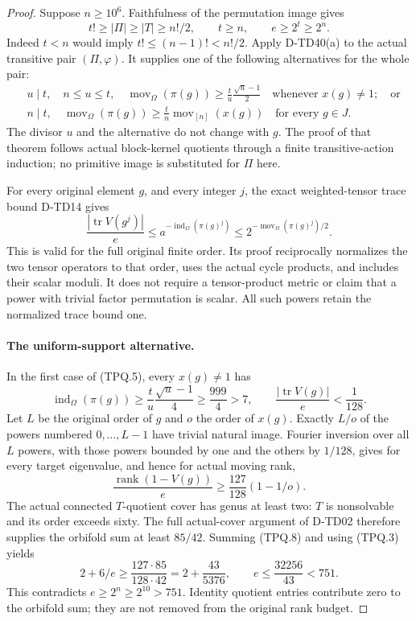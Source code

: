 \begin{proof}
Suppose $n\ge10^6$. Faithfulness of the permutation image gives
\[
               t!\ge|\Pi|\ge|T|\ge n!/2,
                    \qquad t\ge n,
                    \qquad e\ge2^t\ge2^n.
 \tag{TPQ.4}
\]
Indeed $t<n$ would imply $t!\le(n-1)!<n!/2$.
Apply D-TD40(a) to the actual transitive pair $(\Pi,\varphi)$.
It supplies one of the following alternatives for the whole pair:
\[
 \begin{split}
 &u\mid t,\quad n\le u\le t,\quad
 \operatorname{mov}_\Omega(\pi(g))
       \ge\frac{t}{u}\frac{\sqrt u-1}{2}
       \quad\text{whenever }x(g)\ne1;\quad\text{or}\\
 &n\mid t,\quad
 \operatorname{mov}_\Omega(\pi(g))
       \ge\frac{t}{n}\operatorname{mov}_{[n]}(x(g))
       \quad\text{for every }g\in J.
 \end{split}
 \tag{TPQ.5}
\]
The divisor $u$ and the alternative do not change with $g$.
The proof of that theorem follows actual block-kernel quotients
through a finite transitive-action induction; no primitive image
is substituted for $\Pi$ here.

For every original element $g$, and every integer $j$, the exact
weighted-tensor trace bound D-TD14 gives
\[
 \frac{|\operatorname{tr}V(g^j)|}{e}
    \le a^{-\operatorname{ind}_\Omega(\pi(g)^j)}
    \le2^{-\operatorname{mov}_\Omega(\pi(g)^j)/2}.
 \tag{TPQ.6}
\]
This is valid for the full original finite order. Its proof
reciprocally normalizes the two tensor operators to that order,
uses the actual cycle products, and includes their scalar moduli.
It does not require a tensor-product metric or claim that a power
with trivial factor permutation is scalar. All such powers retain
the normalized trace bound one.

\paragraph{The uniform-support alternative.}
In the first case of (TPQ.5), every $x(g)\ne1$ has
\[
 \operatorname{ind}_\Omega(\pi(g))
    \ge\frac{t}{u}\frac{\sqrt u-1}{4}
    \ge\frac{999}{4}>7,
 \qquad
 \frac{|\operatorname{tr}V(g)|}{e}<\frac1{128}.
 \tag{TPQ.7}
\]
Let $L$ be the original order of $g$ and $o$ the order of $x(g)$.
Exactly $L/o$ of the powers numbered $0,\ldots,L-1$ have trivial
natural image. Fourier inversion over all $L$ powers, with those
powers bounded by one and the others by $1/128$, gives for every
target eigenvalue, and hence for actual moving rank,
\[
          \frac{\operatorname{rank}(1-V(g))}{e}
                  \ge\frac{127}{128}(1-1/o).
 \tag{TPQ.8}
\]
The actual connected $T$-quotient cover has genus at least two:
$T$ is nonsolvable and its order exceeds sixty. The full actual-cover
argument of D-TD02 therefore supplies the orbifold sum at least
$85/42$. Summing (TPQ.8) and using (TPQ.3) yields
\[
 2+6/e\ge\frac{127\cdot85}{128\cdot42}
          =2+\frac{43}{5376},
 \qquad e\le\frac{32256}{43}<751.
 \tag{TPQ.9}
\]
This contradicts $e\ge2^n\ge2^{10}>751$.
Identity quotient entries contribute zero to the orbifold sum;
they are not removed from the original rank budget.


\end{proof}
